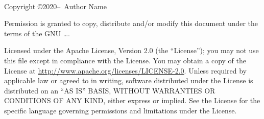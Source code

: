 
\newpage
~\vfill
\thispagestyle{empty}
\setlength{\parindent}{0pt}
\setlength{\parskip}{\baselineskip}

\begin{center}
    
\setlength{\parskip}{0.5\baselineskip}
Copyright \copyright 2020--\the\year\ Author Name\par
Permission is granted to copy, distribute and\slash or modify 
this document under the terms of the GNU \ldots. 

\par Licensed under the Apache License, Version 2.0 (the ``License''); you may not
use this file except in compliance with the License. You may obtain a copy
of the License at \url{http://www.apache.org/licenses/LICENSE-2.0}. Unless
required by applicable law or agreed to in writing, software distributed
under the License is distributed on an ``AS IS'' BASIS, WITHOUT
WARRANTIES OR CONDITIONS OF ANY KIND, either express or implied. See the
License for the specific language governing permissions and limitations
under the License.

\end{center}
